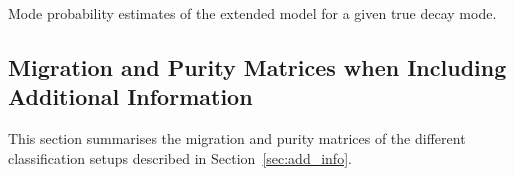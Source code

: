 \begin{minipage}{\textwidth}
\begin{subfigure}{0.48\textwidth}
  \end{subfigure}%

  \caption[Mode probability estimates of the RNN-based decay mode classification
  with the extended model]{Mode probability estimates of the extended model for
    a given true decay mode.}
  \label{fig:rnn_multiclass_proba_combined}
\end{minipage}

\clearpage
\subsection{Migration and Purity Matrices when Including Additional Information}
\label{sec:app_decay_mode_exp}

This section summarises the migration and purity matrices of the different
classification setups described in Section~\ref{sec:add_info}.

\vfill

